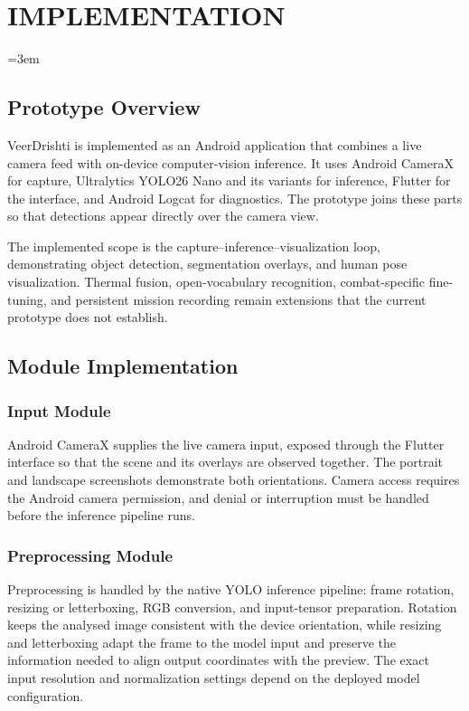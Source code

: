 \chapter{IMPLEMENTATION}\label{ch:implementation}
\begingroup\emergencystretch=3em

\section{Prototype Overview}\label{sec:prototype}
VeerDrishti is implemented as an Android application that combines a live camera feed with
on-device computer-vision inference. It uses Android CameraX for capture, Ultralytics YOLO26 Nano
and its variants for inference, Flutter for the interface, and Android Logcat for diagnostics. The
prototype joins these parts so that detections appear directly over the camera view.

The implemented scope is the capture--inference--visualization loop, demonstrating object detection,
segmentation overlays, and human pose visualization. Thermal fusion, open-vocabulary recognition,
combat-specific fine-tuning, and persistent mission recording remain extensions that the current
prototype does not establish.

\label{end:prototype}
\section{Module Implementation}\label{sec:modules}

\subsection{Input Module}
Android CameraX supplies the live camera input, exposed through the Flutter interface so that the
scene and its overlays are observed together. The portrait and landscape screenshots demonstrate
both orientations. Camera access requires the Android camera permission, and denial or interruption
must be handled before the inference pipeline runs.

\subsection{Preprocessing Module}
Preprocessing is handled by the native YOLO inference pipeline: frame rotation, resizing or
letterboxing, RGB conversion, and input-tensor preparation. Rotation keeps the analysed image
consistent with the device orientation, while resizing and letterboxing adapt the frame to the model
input and preserve the information needed to align output coordinates with the preview. The exact
input resolution and normalization settings depend on the deployed model configuration.

